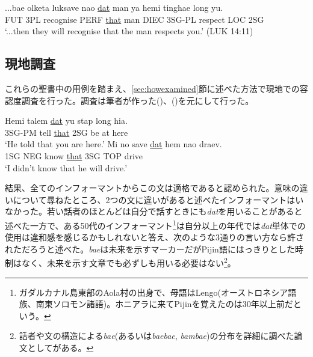 \begin{exe}
\ex
\gll ...bae olketa luksave nao \underline{dat} man ya hemi tinghae long yu.\\
FUT 3PL recognise PERF \underline{that} man DIEC 3SG-PL respect LOC 2SG\\
\glt `...then they will recognise that the man respects you.' (LUK 14:11)
\end{exe}


\subsection{現地調査}\label{sec:datfield}

これらの聖書中の用例を踏まえ、\ref{sec:howexamined}節に述べた方法で現地での容認度調査を行った。調査は筆者が作った()、()を元にして行った。

\begin{exe}
\ex\label{dat1}
\gll Hemi talem \underline{dat} yu stap long hia.\\
3SG-PM tell \underline{that} 2SG be at here\\
\glt `He told that you are here.'
\ex\label{dat2}
\gll Mi no save \underline{dat} hem nao draev.\\
1SG NEG know \underline{that} 3SG TOP drive\\
\glt `I didn't know that he will drive.'
\end{exe}

結果、全てのインフォーマントからこの文は適格であると認められた。意味の違いについて尋ねたところ、2つの文に違いがあると述べたインフォーマントはいなかった。若い話者のほとんどは自分で話すときにも\textit{dat}を用いることがあると述べた一方で、ある50代のインフォーマント\footnote{\label{fn:lengo}ガダルカナル島東部のAola村の出身で、母語はLengo(オーストロネシア語族、南東ソロモン諸語)。ホニアラに来てPijinを覚えたのは30年以上前だという。}は自分以上の年代では\textit{dat}単体での使用は違和感を感じるかもしれないと答え、次のような3通りの言い方なら許されただろうと述べた。\textit{bae}は未来を示すマーカーだがPijin語にはっきりとした時制はなく\citep{eric}、未来を示す文章でも必ずしも用いる必要はない\footnote{
  話者や文の構造による\textit{bae}(あるいは\textit{baebae}, \textit{bambae})の分布を詳細に調べた論文として\cite{bae}がある。
}。

